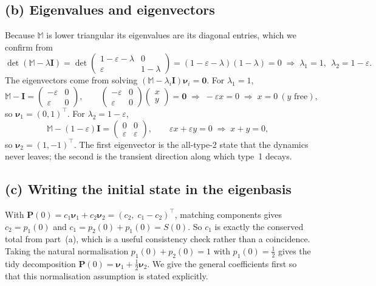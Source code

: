 \documentclass[12pt,a4paper]{article}
\theoremstyle{definition}
\newcommand{\T}{^{\!\top}}
\newcommand{\M}{\mathbb{M}}
\begin{document}
\subsection{(b) Eigenvalues and eigenvectors}
Because $\M$ is lower triangular its eigenvalues are its diagonal entries, which we confirm from
\begin{equation}
  \det(\M-\lambda\mathbf I)=\det\!\begin{pmatrix}1-\varepsilon-\lambda & 0\\[1pt] \varepsilon & 1-\lambda\end{pmatrix}
  =(1-\varepsilon-\lambda)(1-\lambda)=0
  \;\Longrightarrow\; \lambda_1=1,\ \ \lambda_2=1-\varepsilon .
\end{equation}
The eigenvectors come from solving $(\M-\lambda_i\mathbf I)\bm\nu_i=\bm 0$. For $\lambda_1=1$,
\begin{equation}
  \M-\mathbf I=\begin{pmatrix}-\varepsilon & 0\\[1pt] \varepsilon & 0\end{pmatrix},\qquad
  \begin{pmatrix}-\varepsilon & 0\\[1pt] \varepsilon & 0\end{pmatrix}\!\begin{pmatrix}x\\ y\end{pmatrix}=\bm 0
  \;\Rightarrow\; -\varepsilon x=0 \;\Rightarrow\; x=0\ (y\text{ free}),
\end{equation}
so $\bm\nu_1=(0,1)\T$. For $\lambda_2=1-\varepsilon$,
\begin{equation}
  \M-(1-\varepsilon)\mathbf I=\begin{pmatrix}0 & 0\\[1pt] \varepsilon & \varepsilon\end{pmatrix},\qquad
  \varepsilon x+\varepsilon y=0 \;\Rightarrow\; x+y=0,
\end{equation}
so $\bm\nu_2=(1,-1)\T$. The first eigenvector is the all-type-2 state that the dynamics never
leaves; the second is the transient direction along which type~1 decays.

\subsection{(c) Writing the initial state in the eigenbasis}
With $\bm P(0)=c_1\bm\nu_1+c_2\bm\nu_2=(c_2,\;c_1-c_2)\T$, matching components gives
$c_2=p_1(0)$ and $c_1=p_2(0)+p_1(0)=S(0)$. So $c_1$ is exactly the conserved total from part~(a),
which is a useful consistency check rather than a coincidence. Taking the natural normalisation
$p_1(0)+p_2(0)=1$ with $p_1(0)=\tfrac12$ gives the tidy decomposition
$\bm P(0)=\bm\nu_1+\tfrac12\bm\nu_2$. We give the general coefficients first so that this
normalisation assumption is stated explicitly.
\end{document}
